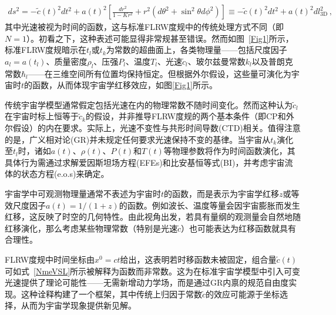 \documentclass[jkps,preprint,fleqn]{revtex4}
\newcommand{\tc}{\tilde{c}}
\begin{document}
\begin{align}
ds^2 = - \tc(t)^2 dt^2 + a(t)^2 \left[ \frac{dr^2}{1-Kr^2} + r^2  \left( d \theta^2 + \sin^2 \theta d \phi^2 \right)  \right] \equiv - \tc(t)^2 dt^2 + a(t)^2 dl_{3\textrm{D}}^2 \label{dstgen} \,,
\end{align}
其中光速被视为时间的函数，这与标准FLRW度规中的传统处理方式不同（即$N=1$）。初看之下，这种表述可能显得非常规甚至错误。然而如图~\ref{Fig1}所示，标准FLRW度规暗示在$t_l$或$t_k$为常数的超曲面上，各类物理量——包括尺度因子$a_l = a(t_l)$、质量密度$\rho_l$、压强$P_l$、温度$T_l$、光速$\tc_l$、玻尔兹曼常数$k_l$以及普朗克常数$\hbar_l$——在三维空间所有位置均保持恒定。但根据外尔假设，这些量可演化为宇宙时$t$的函数，从而体现宇宙学红移效应，如图\ref{Fig1}所示。

传统宇宙学模型通常假定包括光速在内的物理常数不随时间变化。然而这种认为$\tc_l$在宇宙时标上恒等于$\tc_k$的假设，并非推导FLRW度规的两个基本条件（即CP和外尔假设）的内在要求。实际上，光速不变性与共形时间导数(CTD)相关。值得注意的是，广义相对论(GR)并未规定任何要求光速保持不变的基律。当宇宙从$t_k$演化至$t_l$时，诸如$a(t)$、$\rho(t)$、$P(t)$和$T(t)$等物理参数将作为时间函数演化，其具体行为需通过求解爱因斯坦场方程(EFEs)和比安基恒等式(BI)，并考虑宇宙流体的状态方程(e.o.s)来确定。

宇宙学中可观测物理量通常不表述为宇宙时$t$的函数，而是表示为宇宙学红移$z$或等效尺度因子$a(t) = 1/(1+z)$的函数。例如波长、温度等量会因宇宙膨胀而发生红移，这反映了时空的几何特性。由此视角出发，若具有量纲的观测量会自然地随红移演化，那么考虑某些物理常数（特别是光速$\tc$）也可能表达为红移函数就具有合理性。

FLRW度规中时间坐标由$x^0 = ct$给出，这表明若时移函数未被固定，组合量$\tc(t)$可如式~\eqref{NmeVSL}所示被解释为函数而非常数。这为在标准宇宙学模型中引入可变光速提供了理论可能性——无需新增动力学场，而是通过GR内禀的规范自由度实现\cite{Lee:2024zcu}。这种诠释构建了一个框架，其中传统上归因于常数$\tc$的效应可能源于坐标选择，从而为宇宙学现象提供新见解。
\end{document}
